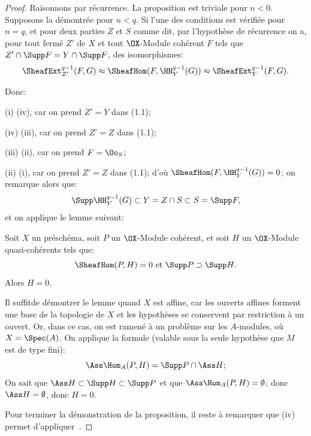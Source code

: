 \begin{proof}
Raisonnons par r\'ecurrence. La proposition est triviale pour $n < 0$. Supposons la d\'emontr\'ee pour $n < q$. Si l'une des conditions est v\'erifi\'ee pour $n = q$, et pour deux parties $Z$ et $S$ comme dit, par l'hypoth\`ese de r\'ecurrence on a, pour tout ferm\'e $Z'$ de $X$ et tout $\OX$-Module coh\'erent $F$ tels que $Z' \cap \Supp F = Y \cap \Supp F$, des isomorphismes:
\begin{equation}\label{eq:VII.1.1}\SheafExt^{q-1}_{Z'} (F, G) \approx \SheafHom (F, \HH^{q-1}_Y (G)) \approx \SheafExt^{q-1}_Y (F, G).\end{equation}

\noindent Donc:

(i) \ALORS (iv), car on prend $Z' = Y$ dans (1.1);

(iv) \ALORS (iii), car on prend $Z' = Z$ dans (1.1);

(iii) \ALORS (ii), car on prend $F = \Oo_S$;

(ii) \ALORS (i), car on prend $Z' = Z$ dans (1.1); d'o\`u $\SheafHom (F, \HH_Y^{q-1} (G)) = 0$; on remarque alors que:
\[
\Supp \HH_Y^{q-1} (G) \subset Y = Z \cap S \subset S = \Supp F,
\]
et on applique le lemme suivant:

\begin{lemme} \label{VII.1.3}
Soit $X$ un pr\'esch\'ema, soit $P$ un $\OX$-Module coh\'erent, et soit $H$ un $\OX$-Module quasi-coh\'erents tels que:
\[
\SheafHom (P, H) = 0 \text{ et } \Supp P \supset \Supp H.
\]
Alors $H = 0$.
\end{lemme}

Il suffit\pageoriginaled de d\'emontrer le lemme quand $X$ est affine, car les ouverts affines forment une base de la topologie de $X$ et les hypoth\`eses se conservent par restriction \`a un ouvert. Or, dans ce cas, on est ramen\'e \`a un probl\`eme sur les $A$-modules, o\`u $X = \Spec(A)$. On applique la formule (valable sous la seule hypoth\`ese que $M$ est de type fini):
\[
\Ass \Hom_A (P, H) = \Supp P \cap \Ass H;\]
On sait que $\Ass H \subset \Supp H \subset \Supp P$ et que $\Ass \Hom_A (P, H) = \emptyset$; donc $\Ass H = \emptyset$, donc $H = 0$.

Pour terminer la d\'emonstration de la proposition, il reste \`a remarquer que (iv) permet d'appliquer~.
\skipqed
\end{proof}

